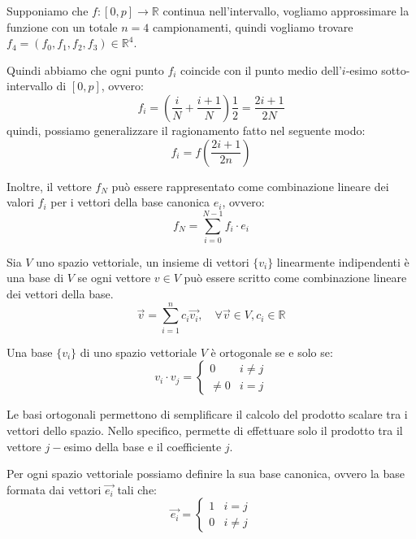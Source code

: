 Supponiamo che $f:[0,p] \to \mathbb{R}$ continua nell'intervallo, vogliamo approssimare
la funzione con un totale $n = 4$ campionamenti, quindi vogliamo trovare $f_4 = (f_0, f_1,f_2,f_3)\in \mathbb{R}^4$.

Quindi abbiamo che ogni punto $f_i$ coincide con il punto medio dell'$i$-esimo
sotto-intervallo di $[0,p]$, ovvero:
\begin{equation*}
    f_i= \left(\frac{i}{N} + \frac{i+1}{N}\right) \frac{1}{2} = \frac{2i+1}{2N}
\end{equation*}
quindi, possiamo generalizzare il ragionamento fatto nel seguente modo:
\begin{equation*}
    f_i = f(\frac{2i+1}{2n})
\end{equation*}

Inoltre, il vettore $f_N$ può essere rappresentato come combinazione lineare dei
valori $f_i$ per i vettori della base canonica $e_i$, ovvero:
\begin{equation}
    f_N = \sum_{i=0}^{N-1} f_i \cdot e_i
\end{equation}
\begin{definizione}
    Sia $V$ uno spazio vettoriale, un insieme di vettori $\{v_i\}$ linearmente
    indipendenti è una base di $V$ se ogni vettore $v \in V$ può essere scritto
    come combinazione lineare dei vettori della base.
    \begin{equation}
        \vec{v} = \sum_{i=1}^{n} c_i \vec{v_i}, \quad \forall \vec{v} \in V, c_i \in \mathbb{R}
    \end{equation}
\end{definizione}
\begin{definizione}
    Una base $\{v_i\}$ di uno spazio vettoriale $V$ è ortogonale se e solo se:
    \begin{equation}
        v_i\cdot v_j = \begin{cases}
            0     & i\ne j \\
            \ne 0 & i = j
        \end{cases}
    \end{equation}
\end{definizione}
Le basi ortogonali permettono di semplificare il calcolo del prodotto scalare
tra i vettori dello spazio. Nello specifico, permette di effettuare solo il
prodotto tra il vettore $j-$esimo della base e il coefficiente $j$.
\begin{nota}
    Per ogni spazio vettoriale possiamo definire la sua base canonica, ovvero
    la base formata dai vettori $\vec{e_i}$ tali che:
    \begin{equation}
        \vec{e_i} = \begin{cases}
            1 & i = j   \\
            0 & i \ne j
        \end{cases}
    \end{equation}
\end{nota}
